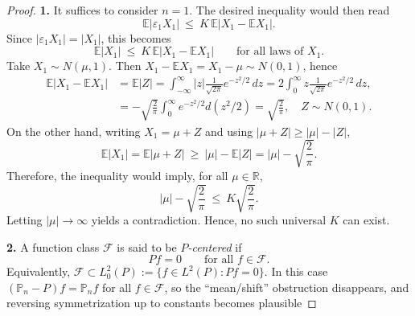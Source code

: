 \documentclass[12pt]{article}
\renewcommand{\(}{\left(}%
\renewcommand{\)}{\right)}%
\renewcommand{\[}{\left[}%
\renewcommand{\]}{\right]}%
\newtheorem{proof}{Proof.}}
\begin{document}
\begin{proof}
\textbf{1.}
It suffices to consider $n=1$. The desired inequality would then read
\begin{equation*}
\mathbb E|\varepsilon_1 X_1|
\ \le\
K\,\mathbb E|X_1-\mathbb E X_1|.
\end{equation*}
Since $|\varepsilon_1 X_1|=|X_1|$, this becomes
\begin{equation*}
\mathbb E|X_1|
\ \le\
K\,\mathbb E|X_1-\mathbb E X_1|
\qquad\text{for all laws of }X_1.
\end{equation*}
Take $X_1\sim N(\mu,1)$. Then $X_1-\mathbb E X_1=X_1-\mu\sim N(0,1)$, hence
\begin{equation*}
\begin{split}
	\mathbb E|X_1-\mathbb E X_1|&=\mathbb E|Z|=
\int_{-\infty}^{\infty} |z| \frac{1}{\sqrt{2\pi}} e^{-z^2/2}\,dz =
2 \int_{0}^{\infty} z \frac{1}{\sqrt{2\pi}} e^{-z^2/2}\,dz,\\
&=-\sqrt{\frac{2}{\pi}}\int_0^\infty e^{-z^2/2}d(z^2/2)=\sqrt{\frac{2}{\pi}},\quad Z\sim N(0,1).
\end{split}
\end{equation*}
On the other hand, writing $X_1=\mu+Z$ and using $|\mu+Z|\ge|\mu|-|Z|$,
\begin{equation*}
\mathbb E|X_1|
=\mathbb E|\mu+Z|
\ \ge\
|\mu|-\mathbb E|Z|
=
|\mu|-\sqrt{\frac{2}{\pi}}.
\end{equation*}
Therefore, the inequality would imply, for all $\mu\in\mathbb R$,
\begin{equation*}
|\mu|-\sqrt{\frac{2}{\pi}}
\ \le\
K\sqrt{\frac{2}{\pi}}.
\end{equation*}
Letting $|\mu|\to\infty$ yields a contradiction. Hence, no such universal $K$ can exist.

\medskip
\noindent
\textbf{2.}
A function class $\mathcal F$ is said to be \emph{$P$-centered} if
\begin{equation*}
Pf=0\qquad\text{for all }f\in\mathcal F.
\end{equation*}
Equivalently, $\mathcal F\subset L_0^2(P):=\{f\in L^2(P):Pf=0\}$. In this case $(\mathbb P_n-P)f=\mathbb P_n f$
for all $f\in\mathcal F$, so the ``mean/shift'' obstruction disappears, and reversing symmetrization up to
constants becomes plausible


\end{proof}
\end{document}
